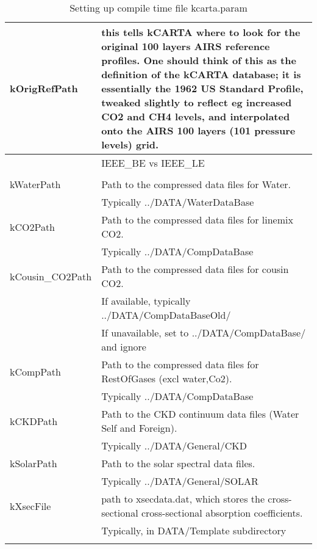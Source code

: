 \documentclass[12pt]{article}
\newlength{\colwidth}
\begin{document}
\begin{longtable}{|l|p{\colwidth}|}
\caption{Setting up compile time file {\sf kcarta.param}\label{kcarta.param}}\\
\hline
kOrigRefPath & this tells kCARTA where to look for the original 100 layers
              AIRS reference profiles. One should think of this as the
              definition of the kCARTA database; it is essentially the 
              1962 US Standard Profile, tweaked slightly to reflect eg 
              increased CO2 and CH4 levels, and interpolated onto the AIRS
              100 layers (101 pressure levels) grid.\\
              \hline \hline
           & IEEE\_BE vs IEEE\_LE\\              
           & \\
kWaterPath & Path to the compressed data files for Water.\\ 
           & Typically {\sf ../DATA/WaterDataBase}\\ 
kCO2Path   & Path to the compressed data files for linemix CO2.\\
           & Typically {\sf ../DATA/CompDataBase}\\ 
kCousin\_CO2Path   & Path to the compressed data files for cousin CO2.\\
           & If available, typically {\sf ../DATA/CompDataBaseOld/}\\ 
           & If unavailable, set to {\sf ../DATA/CompDataBase/} and ignore\\ 
kCompPath  & Path to the compressed data files for RestOfGases 
             (excl water,Co2).\\
           & Typically {\sf ../DATA/CompDataBase}\\ 
kCKDPath   & Path to the CKD continuum data files (Water Self and Foreign).\\ 
           & Typically {\sf ../DATA/General/CKD}\\ 
kSolarPath & Path to the solar spectral data files.\\
           & Typically {\sf ../DATA/General/SOLAR}\\ 
kXsecFile & path to {\sf xsecdata.dat}, which stores the cross-sectional 
               cross-sectional absorption coefficients.\\
              & Typically, in DATA/Template subdirectory\\ \hline \hline
           & \\

\end{longtable}
\end{document}
